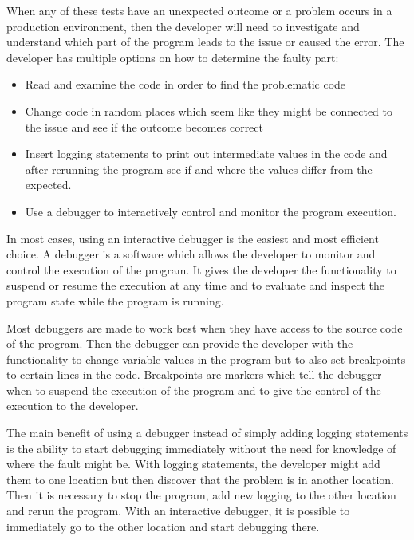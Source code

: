 \documentclass[..thesis.tex]{subfiles}
\begin{document}
When any of these tests have an unexpected outcome or a problem occurs in a production environment, then the developer will need to investigate and understand which part of the program leads to the issue or caused the error.
The developer has multiple options on how to determine the faulty part:
\begin{itemize}
  \item Read and examine the code in order to find the problematic code
  \item Change code in random places which seem like they might be connected to the issue and see if the outcome becomes correct
  \item Insert logging statements to print out intermediate values in the code and after rerunning the program see if and where the values differ from the expected.
  \item Use a debugger to interactively control and monitor the program execution.
\end{itemize}

In most cases, using an interactive debugger is the easiest and most efficient choice. 
A debugger is a software which allows the developer to monitor and control the execution of the program.
It gives the developer the functionality to suspend or resume the execution at any time and to evaluate and inspect the program state while the program is running. 

Most debuggers are made to work best when they have access to the source code of the program. 
Then the debugger can provide the developer with the functionality to change variable values in the program but to also set breakpoints to certain lines in the code. 
Breakpoints are markers which tell the debugger when to suspend the execution of the program and to give the control of the execution to the developer.

The main benefit of using a debugger instead of simply adding logging statements is the ability to start debugging immediately without the need for knowledge of where the fault might be.
With logging statements, the developer might add them to one location but then discover that the problem is in another location. 
Then it is necessary to stop the program, add new logging to the other location and rerun the program.
With an interactive debugger, it is possible to immediately go to the other location and start debugging there.
\end{document}
